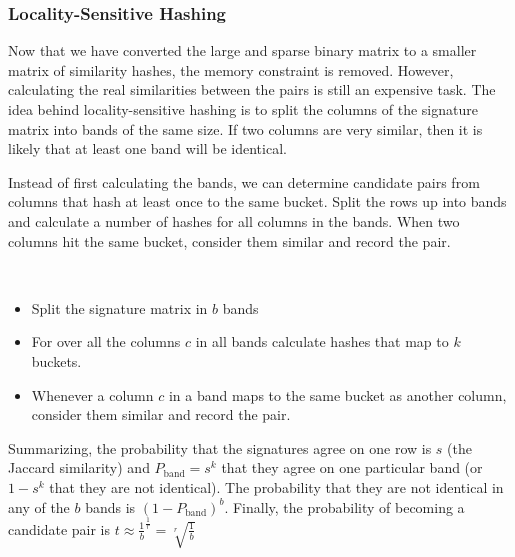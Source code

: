\subsubsection{Locality-Sensitive Hashing}

Now that we have converted the large and sparse binary matrix to a
smaller matrix of similarity hashes, the memory constraint is
removed. However, calculating the real similarities between the
pairs is still an expensive task. The idea behind locality-sensitive
hashing is to split the columns of the signature matrix into bands of
the same size. If two columns are very similar, then it is likely that
at least one band will be identical.

Instead of first calculating the bands, we can determine candidate
pairs from columns that hash at least once to the same bucket. Split
the rows up into bands and calculate a number of hashes for all columns
in the bands. When two columns hit the same bucket, consider them similar
and record the pair.

\begin{definition}
  ~
  \begin{itemize}
    \item Split the signature matrix in $b$ bands
    \item For over all the columns $c$ in all bands calculate
      hashes that map to $k$ buckets.
    \item Whenever a column $c$ in a band maps to the same bucket
      as another column, consider them similar and record the pair.
  \end{itemize}
\end{definition}

Summarizing, the probability that the signatures agree on one row is
$s$ (the Jaccard similarity) and $P_\text{band} = s^k$ that they agree
on one particular band (or $1 - s^k$ that they are not identical).
The probability that they are not identical in any of the $b$ bands is
$(1 - P_\text{band})^b$. Finally, the probability of becoming a candidate
pair is $t \approx \frac{1}{b}^{\frac{1}{r}} = \sqrt[r]{\frac{1}{b}}$
